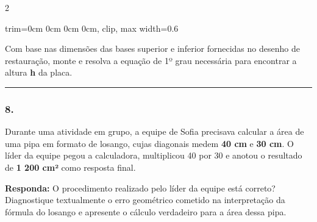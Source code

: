 \documentclass[twoside, 10pt, a4paper]{article}
\newlength{\espacoPreQuestao}\setlength{\espacoPreQuestao}{0.1cm}
\newlength{\espacoQuestao}\setlength{\espacoQuestao}{0.2cm}
\begin{document}
\begin{multicols*}{2}
\begin{center}
\begin{adjustbox}{trim=0cm 0cm 0cm 0cm, clip, max width=0.6\linewidth}
\end{adjustbox}
\end{center}

Com base nas dimensões das bases superior e inferior fornecidas no desenho de restauração, monte e resolva a equação de 1º grau necessária para encontrar a altura \textbf{h} da placa.
\par\vspace{\espacoQuestao}

\noindent\textcolor{CorLinha}{\rule{\linewidth}{0.5pt}}
\par\vspace{\espacoPreQuestao}
\subsubsection*{8.} Durante uma atividade em grupo, a equipe de Sofia precisava calcular a área de uma pipa em formato de losango, cujas diagonais medem \textbf{40 cm} e \textbf{30 cm}. O líder da equipe pegou a calculadora, multiplicou 40 por 30 e anotou o resultado de \textbf{1 200 cm²} como resposta final.
\begin{boxresponda}
\textbf{Responda:} O procedimento realizado pelo líder da equipe está correto? Diagnostique textualmente o erro geométrico cometido na interpretação da fórmula do losango e apresente o cálculo verdadeiro para a área dessa pipa.
\end{boxresponda}
\par\vspace{\espacoQuestao}


\end{multicols*}
\end{document}
